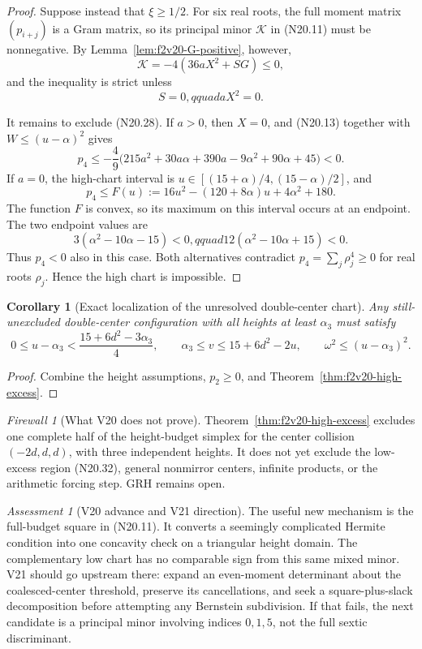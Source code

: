 \documentclass[11pt]{article}
\newtheorem{corollary}[theorem]{Corollary}
\theoremstyle{definition}
\theoremstyle{remark}
\newtheorem{assessment}[theorem]{Assessment}
\newtheorem{firewall}[theorem]{Firewall}
\begin{document}
\begin{proof}
Suppose instead that \(\xi\geq1/2\).  For six real roots, the full moment
matrix \((p_{i+j})\) is a Gram matrix, so its principal minor
\(\mathcal K\) in \textup{(N20.11)} must be nonnegative.  By
Lemma~\ref{lem:f2v20-G-positive}, however,
\[
 \mathcal K=-4(36aX^2+SG)\leq0,
 \tag{N20.27}
\]
and the inequality is strict unless
\[
 S=0,qquad aX^2=0.
 \tag{N20.28}
\]

It remains to exclude \textup{(N20.28)}.  If \(a>0\), then \(X=0\), and
\textup{(N20.13)} together with \(W\leq(u-\alpha)^2\) gives
\[
 p_4\leq-\frac49\bigl(215a^2+30a\alpha+390a
                  -9\alpha^2+90\alpha+45\bigr)<0.
 \tag{N20.29}
\]
If \(a=0\), the high-chart interval is
\(u\in[(15+\alpha)/4,(15-\alpha)/2]\), and
\[
 p_4\leq F(u):=16u^2-(120+8\alpha)u+4\alpha^2+180.
 \tag{N20.30}
\]
The function \(F\) is convex, so its maximum on this interval occurs at an
endpoint.  The two endpoint values are
\[
 3(\alpha^2-10\alpha-15)<0,qquad
 12(\alpha^2-10\alpha+15)<0.
 \tag{N20.31}
\]
Thus \(p_4<0\) also in this case.  Both alternatives contradict
\(p_4=\sum_j\rho_j^4\geq0\) for real roots \(\rho_j\).  Hence the high
chart is impossible.
\end{proof}

\begin{corollary}[Exact localization of the unresolved double-center chart]
\label{cor:f2v20-localization}
Any still-unexcluded double-center configuration with all heights at least
\(\alpha_3\) must satisfy
\[
 0\leq u-\alpha_3<\frac{15+6d^2-3\alpha_3}{4},
 \qquad
 \alpha_3\leq v\leq15+6d^2-2u,
 \qquad
 \omega^2\leq(u-\alpha_3)^2.
 \tag{N20.32}
\]
\end{corollary}

\begin{proof}
Combine the height assumptions, \(p_2\geq0\), and
Theorem~\ref{thm:f2v20-high-excess}.
\end{proof}

\begin{firewall}[What V20 does not prove]
\label{fire:f2v20}
Theorem~\ref{thm:f2v20-high-excess} excludes one complete half of the
height-budget simplex for the center collision \((-2d,d,d)\), with three
independent heights.  It does not yet exclude the low-excess region
\textup{(N20.32)}, general nonmirror centers, infinite products, or the
arithmetic forcing step.  GRH remains open.
\end{firewall}

\begin{assessment}[V20 advance and V21 direction]
\label{ass:f2v20}
The useful new mechanism is the full-budget square in
\textup{(N20.11)}.  It converts a seemingly complicated Hermite condition
into one concavity check on a triangular height domain.  The complementary
low chart has no comparable sign from this same mixed minor.  V21 should go
upstream there: expand an even-moment determinant about the coalesced-center
threshold, preserve its cancellations, and seek a square-plus-slack
decomposition before attempting any Bernstein subdivision.  If that fails,
the next candidate is a principal minor involving indices \(0,1,5\), not
the full sextic discriminant.
\end{assessment}
\end{document}
